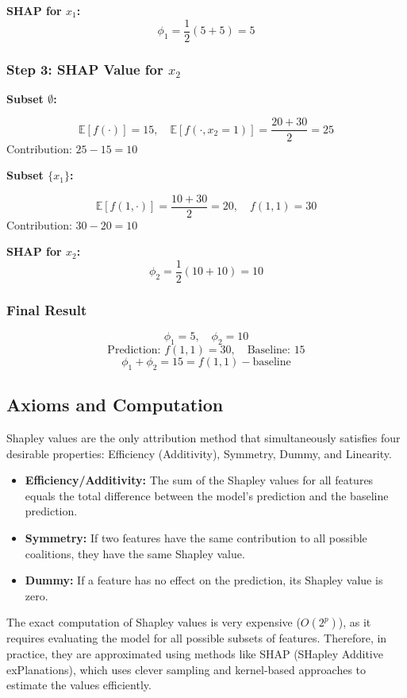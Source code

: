 \documentclass{article}
\begin{document}
\begin{multicols}{2}
	\medskip
	\textbf{SHAP for \( x_1 \):}
	\[
		\phi_1 = \frac{1}{2}(5 + 5) = 5
	\]

	\subsubsection{Step 3: SHAP Value for \( x_2 \)}

	\textbf{Subset \(\emptyset\):}

	\[
		\mathbb{E}[f(\cdot)] = 15, \quad
		\mathbb{E}[f(\cdot, x_2=1)] = \frac{20 + 30}{2} = 25
	\]
	Contribution: \( 25 - 15 = 10 \)

	\medskip
	\textbf{Subset \(\{x_1\}\):}

	\[
		\mathbb{E}[f(1, \cdot)] = \frac{10 + 30}{2} = 20, \quad f(1,1) = 30
	\]
	Contribution: \( 30 - 20 = 10 \)

	\medskip
	\textbf{SHAP for \( x_2 \):}
	\[
		\phi_2 = \frac{1}{2}(10 + 10) = 10
	\]

	\subsubsection{Final Result}

	\[
		\phi_1 = 5, \quad \phi_2 = 10
	\]
	\[
		\text{Prediction: } f(1,1) = 30, \quad \text{Baseline: } 15
	\]
	\[
		\phi_1 + \phi_2 = 15 = f(1,1) - \text{baseline}
	\]

	\subsection{Axioms and Computation}
	Shapley values are the only attribution method that simultaneously satisfies four desirable properties: Efficiency (Additivity), Symmetry, Dummy, and Linearity.
	\begin{itemize}
		\item \textbf{Efficiency/Additivity:} The sum of the Shapley values for all features equals the total difference between the model's prediction and the baseline prediction.
		\item \textbf{Symmetry:} If two features have the same contribution to all possible coalitions, they have the same Shapley value.
		\item \textbf{Dummy:} If a feature has no effect on the prediction, its Shapley value is zero.
	\end{itemize}
	The exact computation of Shapley values is very expensive ($O(2^p)$), as it requires evaluating the model for all possible subsets of features. Therefore, in practice, they are approximated using methods like SHAP (SHapley Additive exPlanations), which uses clever sampling and kernel-based approaches to estimate the values efficiently.



\end{multicols}
\end{document}
